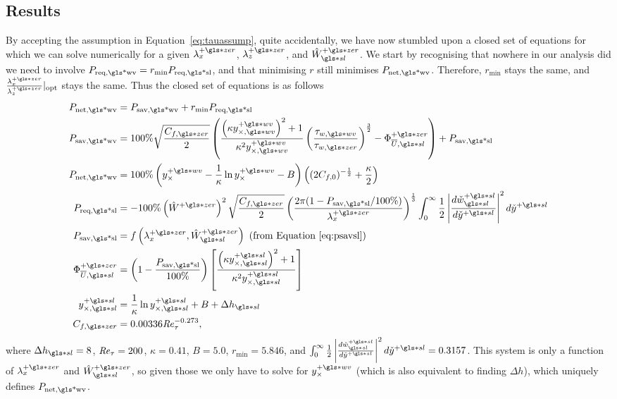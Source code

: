 \subsection{Results}
By accepting the assumption in Equation~\eqref{eq:tauassump}, quite accidentally, we have now stumbled upon a closed set of equations for which we can solve numerically for a given  $\lambda_x\pz$, $\lambda_z\pz$, and $\hat{W}\ssl\pz$. We start by recognising that nowhere in our analysis did we need to involve $P_\text{req,\gls*{wv}}=r_\text{min} P_\text{req,\gls*{sl}}  $, and that minimising $r$ still minimises  $P_\text{net,\gls*{wv}} $. Therefore, $r_\text{min} $ stays the same, and $\frac{\lambda_x\pz}{\lambda_z\pz}\rvert_\text{opt} $ stays the same. Thus the closed set of equations is as follows
\begin{align}
	P_\text{net,\gls*{wv}} &= P_\text{sav,\gls*{wv}} + r_\text{min} P_\text{req,\gls*{sl}} \label{eq:Pnetww}\\  
	P_\text{sav,\gls*{wv}} &=  100\% \sqrt{\frac{C_{f,\gls*{zer}}}{2}}\left(  \frac{\left(  \kappa y_{\times,\gls*{wv}}\pw  \right) ^2+ 1}{\kappa^2 y_{\times,\gls*{wv}}\pw} \left( \frac{\tau_{w,\gls*{wv}}}{\tau_{w,\gls*{zer}}} \right) ^{\frac{3}{2}}-\Phi _{\overline{U},\gls*{sl}}\pz\right) +P_\text{sav,\gls*{sl}} \label{eq:Psavww}\\
	P_\text{net,\gls*{wv}} &=100\%\left(  y_{\times}\pw - \frac{1}{\kappa}\ln y_{\times}\pw- B \right) \left( (2C_{f,0})^{-\frac{1}{2}} +\frac{\kappa}{2} \right) \label{eq:ycross}\\
	P_\text{req,\gls*{sl}} &= -100\%\left( \hat{W}\pz  \right) ^2\sqrt{\frac{C_{f,\gls*{zer}}}{2}}   \left( \frac{2\pi (1-P_\text{sav,\gls*{sl}} / 100\%) }{\lambda_x\pz}\right) ^{\frac{1}{3}}\int_{0}^{\infty} \frac{1}{2} \left| \frac{d\check{w}\ps\ssl}{d\check{y}\ps} \right| ^2 d\check{y}\ps \\ 
		P_\text{sav,\gls*{sl}} &= f\left(\lambda_x\pz, \hat{W}\ssl\pz\right) \text{ (from Equation~\eqref{eq:psavsl})}\\
		\Phi _{\overline{U},\gls*{sl}}\pz &= \left( 1-\frac{P_\text{sav,\gls*{sl}} }{100\%} \right)  \left[\frac{\left(  \kappa y_{\times,\gls*{sl}}\ps  \right) ^2+ 1}{\kappa^2 y_{\times,\gls*{sl}}\ps}\right]\\
	y_{\times,\gls*{sl}}\ps&=\frac{1}{\kappa}\ln  y_{\times,\gls*{sl}}\ps +B+\Delta h\ssl \\
	C_{f,\gls*{zer}} &= 0.00336\Rey_{\tau}^{-0.273}
,\end{align}
where $\Delta h \ssl=8$, $\mbox{\textit{Re}}_{\tau} = 200$,  $\kappa=0.41$,  $B=5.0$,  $r_\text{min} =5.846$, and $\int_{0}^{\infty} \frac{1}{2} \left| \frac{d\check{w}\ps\ssl}{d\check{y}\ps} \right| ^2 d\check{y}\ps = 0.3157$. This system is only a function of $\lambda_x\pz$ and  $\hat{W}\ssl\pz$, so given those we only have to solve for $y_{\times}\pw$ (which is also equivalent to finding $\Delta h$), which uniquely defines $P_\text{net,\gls*{wv}} $.

